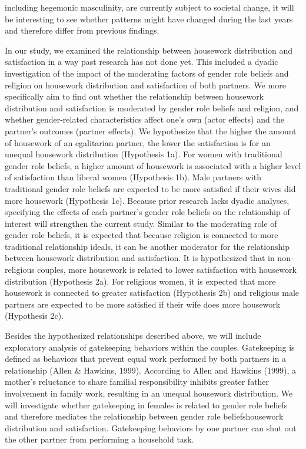 \documentclass[
  man,floatsintext]{apa6}
\begin{document}
including hegemonic masculinity, are currently subject to societal change, it will be interesting to see whether patterns might have changed during the last years and therefore differ from previous findings.

In our study, we examined the relationship between housework distribution and satisfaction in a way past research has not done yet. This included a dyadic investigation of the impact of the moderating factors of gender role beliefs and religion on housework distribution and satisfaction of both partners. We more specifically aim to find out whether the relationship between housework distribution and satisfaction is moderated by gender role beliefs and religion, and whether gender-related characteristics affect one's own (actor effects) and the partner's outcomes (partner effects).
We hypothesize that the higher the amount of housework of an egalitarian partner, the lower the satisfaction is for an unequal housework distribution (Hypothesis 1a). For women with traditional gender role beliefs, a higher amount of housework is associated with a higher level of satisfaction than liberal women (Hypothesis 1b). Male partners with traditional gender role beliefs are expected to be more satisfied if their wives did more housework (Hypothesis 1c). Because prior research lacks dyadic analyses, specifying the effects of each partner's gender role beliefs on the relationship of interest will strengthen the current study. Similar to the moderating role of gender role beliefs, it is expected that because religion is connected to more traditional relationship ideals, it can be another moderator for the relationship between housework distribution and satisfaction. It is hypothesized that in non-religious couples, more housework is related to lower satisfaction with housework distribution (Hypothesis 2a). For religious women, it is expected that more housework is connected to greater satisfaction (Hypothesis 2b) and religious male partners are expected to be more satisfied if their wife does more housework (Hypothesis 2c).

Besides the hypothesized relationships described above, we will include exploratory analysis of gatekeeping behaviors within the couples. Gatekeeping is defined as behaviors that prevent equal work performed by both partners in a relationship (Allen \& Hawkins, 1999). According to Allen and Hawkins (1999), a mother's reluctance to share familial responsibility inhibits greater father involvement in family work, resulting in an unequal housework distribution. We will investigate whether gatekeeping in females is related to gender role beliefs and therefore mediates the relationship between gender role beliefshousework distribution and satisfaction. Gatekeeping behaviors by one partner can shut out the other partner from performing a household task.
\end{document}
